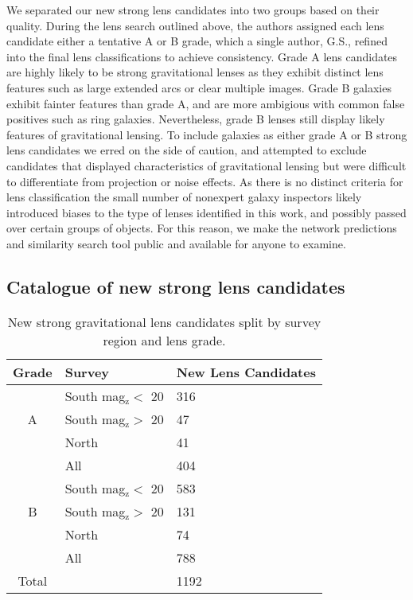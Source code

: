 \documentclass{aastex631}
\newcommand{\zmag}{mag$_{\mathrm{z}}$}
\begin{document}
We separated our new strong lens candidates into two groups based on their quality. During the lens search outlined above, the authors assigned each lens candidate either a tentative A or B grade, which a single author, G.S., refined into the final lens classifications to achieve consistency. Grade A lens candidates are highly likely to be strong gravitational lenses as they exhibit distinct lens features such as large extended arcs or clear multiple images. Grade B galaxies exhibit fainter features than grade A, and are more ambigious with common false positives such as ring galaxies. Nevertheless, grade B lenses still display likely features of gravitational lensing. To include galaxies as either grade A or B strong lens candidates we erred on the side of caution, and attempted to exclude candidates that displayed characteristics of gravitational lensing but were difficult to differentiate from projection or noise effects. As there is no distinct criteria for lens classification the small number of nonexpert galaxy inspectors likely introduced biases to the type of lenses identified in this work, and possibly passed over certain groups of objects. For this reason, we make the network predictions and similarity search tool public and available for anyone to examine.

\subsection{Catalogue of new strong lens candidates}

\begin{table}
\centering
\begin{tabular}{c|l|l}
\textbf{Grade} & \textbf{Survey} & \textbf{New Lens Candidates} \\ 
\hline
& South \zmag $<$ 20 & 316 \\
A & South \zmag $>$ 20 & 47 \\
& North & 41 \\
& All & 404 \\
\hline
& South \zmag $<$ 20& 583 \\
B & South \zmag $>$ 20  & 131 \\
& North & 74 \\
& All & 788 \\
\hline
Total & & 1192 \\
\end{tabular}
\caption{New strong gravitational lens candidates split by survey region and lens grade.}
\label{tab:lenses}
\end{table}
\end{document}
